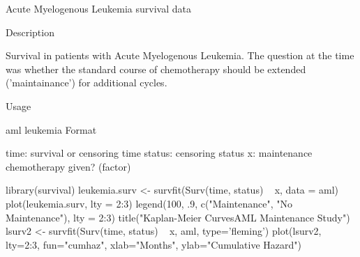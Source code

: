Acute Myelogenous Leukemia survival data

Description

Survival in patients with Acute Myelogenous Leukemia. The question at the time was whether the standard course of chemotherapy should be extended ('maintainance') for additional cycles.

Usage

aml
leukemia
Format

time:	survival or censoring time
status:	censoring status
x:	maintenance chemotherapy given? (factor)


library(survival)
leukemia.surv <- survfit(Surv(time, status) ~ x, data = aml) 
plot(leukemia.surv, lty = 2:3) 
legend(100, .9, c("Maintenance", "No Maintenance"), lty = 2:3) 
title("Kaplan-Meier Curves\nfor AML Maintenance Study") 
lsurv2 <- survfit(Surv(time, status) ~ x, aml, type='fleming') 
plot(lsurv2, lty=2:3, fun="cumhaz", 
xlab="Months", ylab="Cumulative Hazard") 
